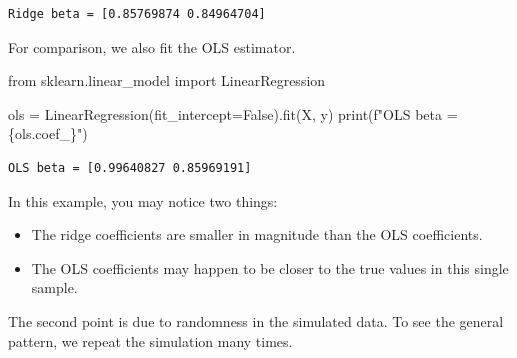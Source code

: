 \documentclass[
  letterpaper,
  DIV=11,
  numbers=noendperiod]{scrreprt}
\newenvironment{Shaded}{\begin{snugshade}}{\end{snugshade}}
\newcommand{\BuiltInTok}[1]{\textcolor[rgb]{0.00,0.23,0.31}{#1}}
\newcommand{\ImportTok}[1]{\textcolor[rgb]{0.00,0.46,0.62}{#1}}
\newcommand{\NormalTok}[1]{\textcolor[rgb]{0.00,0.23,0.31}{#1}}
\newcommand{\OperatorTok}[1]{\textcolor[rgb]{0.37,0.37,0.37}{#1}}
\newcommand{\SpecialCharTok}[1]{\textcolor[rgb]{0.37,0.37,0.37}{#1}}
\newcommand{\SpecialStringTok}[1]{\textcolor[rgb]{0.13,0.47,0.30}{#1}}
\newcommand{\VariableTok}[1]{\textcolor[rgb]{0.07,0.07,0.07}{#1}}
\providecommand{\tightlist}{%
  \setlength{\itemsep}{0pt}\setlength{\parskip}{0pt}}
\theoremstyle{definition}
\theoremstyle{definition}
\theoremstyle{plain}
\theoremstyle{plain}
\theoremstyle{remark}
\begin{document}
\begin{verbatim}
Ridge beta = [0.85769874 0.84964704]
\end{verbatim}

For comparison, we also fit the OLS estimator.

\begin{Shaded}
\begin{Highlighting}[]
\ImportTok{from}\NormalTok{ sklearn.linear\_model }\ImportTok{import}\NormalTok{ LinearRegression}

\NormalTok{ols }\OperatorTok{=}\NormalTok{ LinearRegression(fit\_intercept}\OperatorTok{=}\VariableTok{False}\NormalTok{).fit(X, y)}
\BuiltInTok{print}\NormalTok{(}\SpecialStringTok{f"OLS beta = }\SpecialCharTok{\{}\NormalTok{ols}\SpecialCharTok{.}\NormalTok{coef\_}\SpecialCharTok{\}}\SpecialStringTok{"}\NormalTok{)}
\end{Highlighting}
\end{Shaded}

\begin{verbatim}
OLS beta = [0.99640827 0.85969191]
\end{verbatim}

In this example, you may notice two things:

\begin{itemize}
\tightlist
\item
  The ridge coefficients are smaller in magnitude than the OLS
  coefficients.
\item
  The OLS coefficients may happen to be closer to the true values in
  this single sample.
\end{itemize}

The second point is due to randomness in the simulated data. To see the
general pattern, we repeat the simulation many times.
\end{document}
